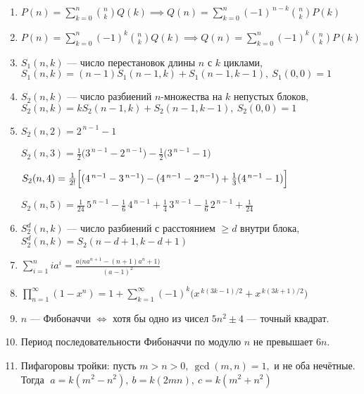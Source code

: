 \begin{enumerate}
\item %
$P(n)=\sum_{k=0}^{n}\binom{n}{k}Q(k) \implies Q(n)=\sum_{k=0}^{n}(-1)^{\,n-k}\binom{n}{k}P(k)$

\item %
$P(n)=\sum_{k=0}^{n}(-1)^k\binom{n}{k}Q(k) \implies Q(n)=\sum_{k=0}^{n}(-1)^k\binom{n}{k}P(k)$

\item %
$S_1(n,k)$ — число перестановок длины $n$ с $k$ циклами,
$S_1(n,k)=(n-1)S_1(n-1,k)+S_1(n-1,k-1),\ S_1(0,0)=1$

\item %
$S_2(n,k)$ — число разбиений $n$-множества на $k$ непустых блоков,
$S_2(n,k)=kS_2(n-1,k)+S_2(n-1,k-1),\ S_2(0,0)=1$

\item %
$S_2(n,2)=2^{\,n-1}-1$

$S_2(n,3)=\tfrac{1}{2}\bigl(3^{\,n-1}-2^{\,n-1}\bigr)-\tfrac{1}{2}\bigl(3^{\,n-1}-1\bigr)$

$S_2(n,4)=\tfrac{1}{2!}\Bigl[(4^{\,n-1}-3^{\,n-1})-(4^{\,n-1}-2^{\,n-1})+\tfrac{1}{3}(4^{\,n-1}-1)\Bigr]$

$S_2(n,5)=\tfrac{1}{24}\,5^{\,n-1}-\tfrac{1}{6}\,4^{\,n-1}
+\tfrac{1}{4}\,3^{\,n-1}-\tfrac{1}{6}\,2^{\,n-1}+\tfrac{1}{24}$

\item %
$S_2^d(n,k)$ — число разбиений с расстоянием $\ge d$ внутри блока,
$S_2^d(n,k)=S_2(n-d+1,k-d+1)$

\item %
$\sum_{i=1}^n i a^i=\frac{a\bigl(n a^{n+1}-(n+1)a^n+1\bigr)}{(a-1)^2}$

\item %
$\prod_{n=1}^\infty(1-x^n)=1+\sum_{k=1}^{\infty}(-1)^k\bigl(x^{\,k(3k-1)/2}+x^{\,k(3k+1)/2}\bigr)$

\item %
$n$ — Фибоначчи $\iff$ хотя бы одно из чисел $5n^2\pm4$ — точный квадрат.

\item %
Период последовательности Фибоначчи по модулю $n$ не превышает $6n$.

\item %
Пифагоровы тройки: пусть $m>n>0,\ \gcd(m,n)=1,$ и не оба нечётные. Тогда
$\;a=k(m^2-n^2),\ b=k(2mn),\ c=k(m^2+n^2)$



\end{enumerate}
